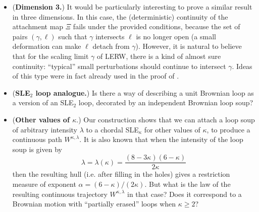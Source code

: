 \documentclass[11pt]{article}
\def\Conf{{\mathscr{R}}}
\def\Att{{\Xi}}
\begin{document}
\begin{itemize}
\item (\textbf{Dimension 3.}) It would be particularly interesting to prove a similar result in three dimensions. In this case, the (deterministic) continuity of the attachment map $\Att$ fails under the provided conditions, because the set of pairs $(\gamma,\ell)$ such that $\gamma$ intersects $\ell$ is no longer open (a small deformation can make $\ell$ detach from $\gamma$). However, it is natural to believe that for the scaling limit $\gamma$ of LERW, there is a kind of almost sure continuity:
``typical'' small perturbations should continue to intersect $\gamma$. Ideas of this type were in fact already used
 in the proof of \cite{SapozhnikovShiraishi}. 


\item (\textbf{SLE$_2$ loop analogue.}) Is there a way of describing a unit Brownian loop as a version of an SLE$_2$ loop, decorated by an independent Brownian loop soup? 


\item (\textbf{Other values of $\kappa$}.) Our construction shows that we can attach a loop soup of arbitrary intensity $\lambda$ to a chordal SLE$_\kappa$ for other values of $\kappa$, to produce a continuous path $W^{\kappa, \lambda}$. It is also known that when the intensity of the loop soup is given by \[\lambda = \lambda(\kappa) = \frac{(8-3\kappa)(6-\kappa)}{2\kappa}\]
then the resulting hull (i.e. after filling in the holes) gives a restriction measure of exponent $\alpha = (6-\kappa)/ (2\kappa)$. But what is the law of the resulting continuous trajectory $W^{\kappa, \lambda}$ in that case? Does it correspond to a Brownian motion with 
``partially erased'' loops when $\kappa \ge 2$? 



\end{itemize}
\end{document}

